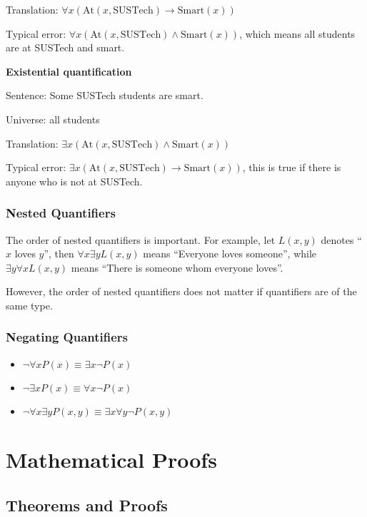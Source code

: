 \documentclass[a4paper,12pt]{article}
\begin{document}
\qquad Translation: $\forall x (\text{At}(x, \text{SUSTech}) \rightarrow \text{Smart}(x))$

\qquad Typical error: $\forall x (\text{At}(x, \text{SUSTech}) \wedge \text{Smart}(x))$, which means all students are at SUSTech and smart.

\textbf{Existential quantification}

\qquad Sentence: Some SUSTech students are smart.

\qquad Universe: all students

\qquad Translation: $\exists x (\text{At}(x, \text{SUSTech}) \wedge \text{Smart}(x))$

\qquad Typical error: $\exists x (\text{At}(x, \text{SUSTech}) \rightarrow \text{Smart}(x))$, this is true if there is anyone who is not at SUSTech.

\subsubsection{Nested Quantifiers}

The order of nested quantifiers is important.
For example, let $L(x,y)$ denotes ``$x$ loves $y$'', then $\forall x \exists y L(x,y)$ means ``Everyone loves someone'', while $\exists y \forall x L(x,y)$ means ``There is someone whom everyone loves''.

However, the order of nested quantifiers does not matter if quantifiers are of the same type.

\subsubsection{Negating Quantifiers}

\begin{itemize}
	\item $\neg \forall x P(x) \equiv \exists x \neg P(x)$
	\item $\neg \exists x P(x) \equiv \forall x \neg P(x)$
	\item $\neg \forall x \exists y P(x,y) \equiv \exists x \forall y \neg P(x,y)$
\end{itemize}

\section{Mathematical Proofs}

\subsection{Theorems and Proofs}
\end{document}
